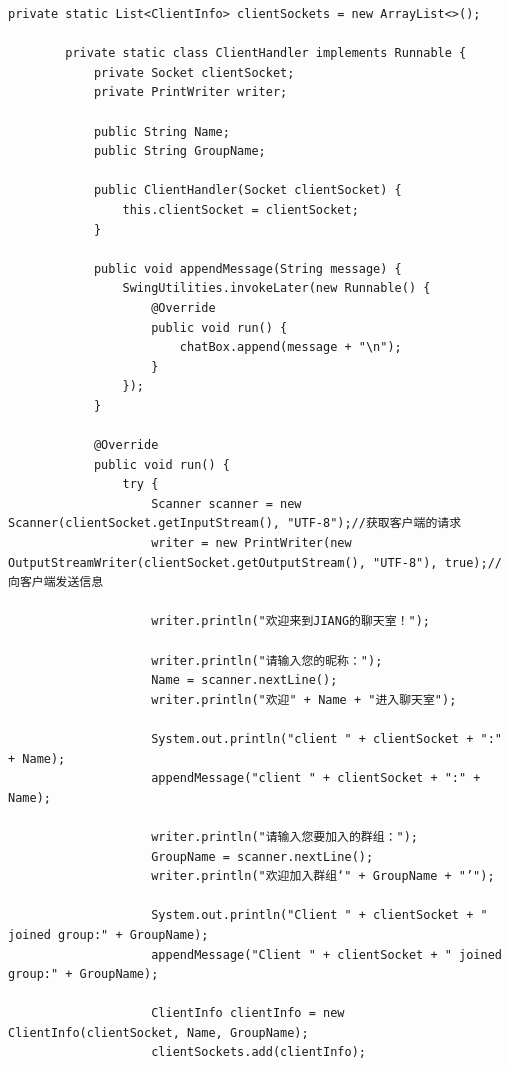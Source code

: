 \documentclass[UTF8,12pt]{article}
\begin{document}
\begin{lstlisting}[title=ChatServer.java源代码,frame=shadowbox]
        private static List<ClientInfo> clientSockets = new ArrayList<>();
    
        private static class ClientHandler implements Runnable {
            private Socket clientSocket;
            private PrintWriter writer;
    
            public String Name;
            public String GroupName;
    
            public ClientHandler(Socket clientSocket) {
                this.clientSocket = clientSocket;
            }
    
            public void appendMessage(String message) {
                SwingUtilities.invokeLater(new Runnable() {
                    @Override
                    public void run() {
                        chatBox.append(message + "\n");
                    }
                });
            }
    
            @Override
            public void run() {
                try {
                    Scanner scanner = new Scanner(clientSocket.getInputStream(), "UTF-8");//获取客户端的请求
                    writer = new PrintWriter(new OutputStreamWriter(clientSocket.getOutputStream(), "UTF-8"), true);//向客户端发送信息
    
                    writer.println("欢迎来到JIANG的聊天室！");
    
                    writer.println("请输入您的昵称：");
                    Name = scanner.nextLine();
                    writer.println("欢迎" + Name + "进入聊天室");
    
                    System.out.println("client " + clientSocket + ":" + Name);
                    appendMessage("client " + clientSocket + ":" + Name);
    
                    writer.println("请输入您要加入的群组：");
                    GroupName = scanner.nextLine();
                    writer.println("欢迎加入群组‘" + GroupName + "’");
    
                    System.out.println("Client " + clientSocket + " joined group:" + GroupName);
                    appendMessage("Client " + clientSocket + " joined group:" + GroupName);
    
                    ClientInfo clientInfo = new ClientInfo(clientSocket, Name, GroupName);
                    clientSockets.add(clientInfo);
    

\end{lstlisting}
\end{document}
